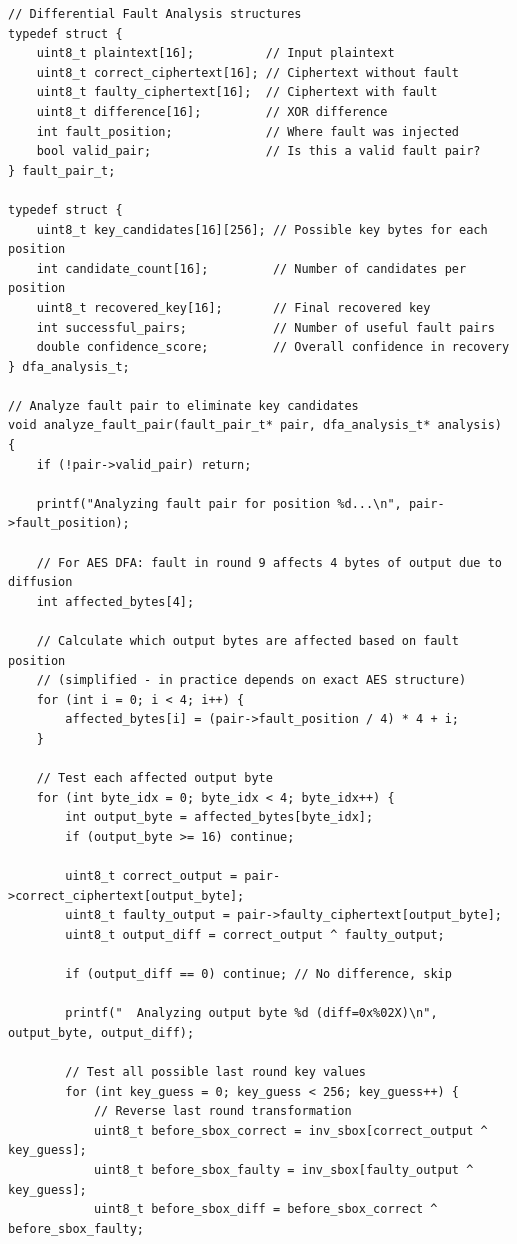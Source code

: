 \documentclass[12pt,a4paper]{article}
\begin{document}
\begin{lstlisting}[caption={Complete DFA Key Recovery Attack}]
// Differential Fault Analysis structures
typedef struct {
    uint8_t plaintext[16];          // Input plaintext
    uint8_t correct_ciphertext[16]; // Ciphertext without fault
    uint8_t faulty_ciphertext[16];  // Ciphertext with fault
    uint8_t difference[16];         // XOR difference
    int fault_position;             // Where fault was injected
    bool valid_pair;                // Is this a valid fault pair?
} fault_pair_t;

typedef struct {
    uint8_t key_candidates[16][256]; // Possible key bytes for each position
    int candidate_count[16];         // Number of candidates per position
    uint8_t recovered_key[16];       // Final recovered key
    int successful_pairs;            // Number of useful fault pairs
    double confidence_score;         // Overall confidence in recovery
} dfa_analysis_t;

// Analyze fault pair to eliminate key candidates
void analyze_fault_pair(fault_pair_t* pair, dfa_analysis_t* analysis) {
    if (!pair->valid_pair) return;
    
    printf("Analyzing fault pair for position %d...\n", pair->fault_position);
    
    // For AES DFA: fault in round 9 affects 4 bytes of output due to diffusion
    int affected_bytes[4];
    
    // Calculate which output bytes are affected based on fault position
    // (simplified - in practice depends on exact AES structure)
    for (int i = 0; i < 4; i++) {
        affected_bytes[i] = (pair->fault_position / 4) * 4 + i;
    }
    
    // Test each affected output byte
    for (int byte_idx = 0; byte_idx < 4; byte_idx++) {
        int output_byte = affected_bytes[byte_idx];
        if (output_byte >= 16) continue;
        
        uint8_t correct_output = pair->correct_ciphertext[output_byte];
        uint8_t faulty_output = pair->faulty_ciphertext[output_byte];
        uint8_t output_diff = correct_output ^ faulty_output;
        
        if (output_diff == 0) continue; // No difference, skip
        
        printf("  Analyzing output byte %d (diff=0x%02X)\n", output_byte, output_diff);
        
        // Test all possible last round key values
        for (int key_guess = 0; key_guess < 256; key_guess++) {
            // Reverse last round transformation
            uint8_t before_sbox_correct = inv_sbox[correct_output ^ key_guess];
            uint8_t before_sbox_faulty = inv_sbox[faulty_output ^ key_guess];
            uint8_t before_sbox_diff = before_sbox_correct ^ before_sbox_faulty;
            

\end{lstlisting}
\end{document}
